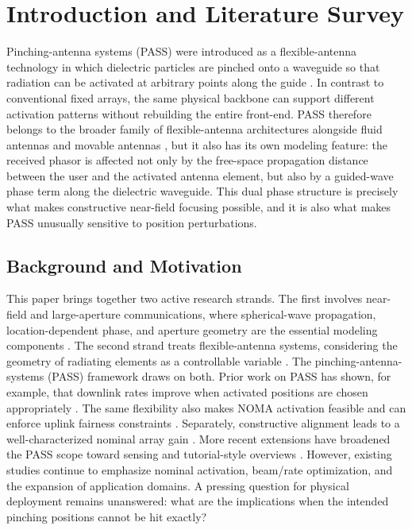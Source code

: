 \section{Introduction and Literature Survey}

Pinching-antenna systems (PASS) were introduced as a flexible-antenna technology in which dielectric particles are pinched onto a waveguide so that radiation can be activated at arbitrary points along the guide \cite{fukuda2022pinching}. In contrast to conventional fixed arrays, the same physical backbone can support different activation patterns without rebuilding the entire front-end. PASS therefore belongs to the broader family of flexible-antenna architectures alongside fluid antennas and movable antennas \cite{wong2021fluid,zhu2024movable,new2025tutorial,zhu2025tutorialma}, but it also has its own modeling feature: the received phasor is affected not only by the free-space propagation distance between the user and the activated antenna element, but also by a guided-wave phase term along the dielectric waveguide. This dual phase structure is precisely what makes constructive near-field focusing possible, and it is also what makes PASS unusually sensitive to position perturbations.

\subsection{Background and Motivation}

This paper brings together two active research strands. The first involves near-field and large-aperture communications, where spherical-wave propagation, location-dependent phase, and aperture geometry are the essential modeling components \cite{ouyang2024primer}. The second strand treats flexible-antenna systems, considering the geometry of radiating elements as a controllable variable \cite{wong2021fluid,zhu2024movable,new2025tutorial,zhu2025tutorialma}. The pinching-antenna-systems (PASS) framework draws on both. Prior work on PASS has shown, for example, that downlink rates improve when activated positions are chosen appropriately \cite{xu2025downlink}. The same flexibility also makes NOMA activation feasible \cite{wang2025noma} and can enforce uplink fairness constraints \cite{tegos2025uplink}. Separately, constructive alignment leads to a well-characterized nominal array gain \cite{ouyang2025array}. More recent extensions have broadened the PASS scope toward sensing \cite{ding2025isac} and tutorial-style overviews \cite{liu2026tutorial}. However, existing studies continue to emphasize nominal activation, beam/rate optimization, and the expansion of application domains. A pressing question for physical deployment remains unanswered: what are the implications when the intended pinching positions cannot be hit exactly?

